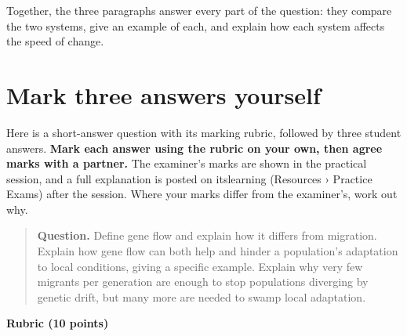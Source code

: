 \documentclass[
  a4paper]{book}
\begin{document}
Together, the three paragraphs answer every part of the question: they compare the two systems, give an example of each, and explain how each system affects the speed of change.

\section{Mark three answers yourself}\label{mark-three-answers-yourself}

Here is a short-answer question with its marking rubric, followed by three student answers. \textbf{Mark each answer using the rubric on your own, then agree marks with a partner.} The examiner's marks are shown in the practical session, and a full explanation is posted on itslearning (Resources › Practice Exams) after the session. Where your marks differ from the examiner's, work out why.

\begin{quote}
\textbf{Question.} Define gene flow and explain how it differs from migration. Explain how gene flow can both help and hinder a population's adaptation to local conditions, giving a specific example. Explain why very few migrants per generation are enough to stop populations diverging by genetic drift, but many more are needed to swamp local adaptation.
\end{quote}

\textbf{Rubric (10 points)}
\end{document}
